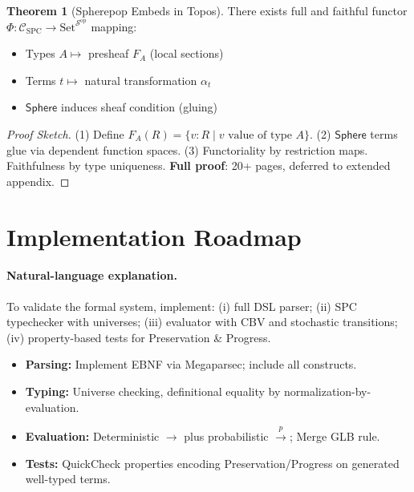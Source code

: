 \documentclass[12pt]{article}
\newcommand{\Sphere}{\mathsf{Sphere}}
\newcommand{\step}{\rightarrow}
\newcommand{\pstep}[1]{\xrightarrow{#1}}
\theoremstyle{definition}
\newtheorem{theorem}{Theorem}
\begin{document}
\begin{theorem}[Spherepop Embeds in Topos]
There exists full and faithful functor $\Phi : \mathcal{C}_{\text{SPC}} \to \text{Set}^{\mathcal{S}^{\text{op}}}$
mapping:
\begin{itemize}
\item Types $A \mapsto$ presheaf $F_A$ (local sections)
\item Terms $t \mapsto$ natural transformation $\alpha_t$
\item $\Sphere$ induces sheaf condition (gluing)
\end{itemize}
\end{theorem}
\begin{proof}[Proof Sketch]
(1) Define $F_A(R) = \{v : R \mid v \text{ value of type } A\}$.
(2) $\Sphere$ terms glue via dependent function spaces.
(3) Functoriality by restriction maps. Faithfulness by type uniqueness.
\textbf{Full proof}: 20+ pages, deferred to extended appendix.
\end{proof}

\section{Implementation Roadmap}
\paragraph{Natural-language explanation.}
To validate the formal system, implement: (i) full DSL parser; (ii) SPC typechecker with universes; (iii) evaluator with CBV and stochastic transitions; (iv) property-based tests for Preservation \& Progress.

\begin{itemize}[noitemsep]
  \item \textbf{Parsing:} Implement EBNF via Megaparsec; include all constructs.
  \item \textbf{Typing:} Universe checking, definitional equality by normalization-by-evaluation.
  \item \textbf{Evaluation:} Deterministic $\step$ plus probabilistic $\pstep{p}$; Merge GLB rule.
  \item \textbf{Tests:} QuickCheck properties encoding Preservation/Progress on generated well-typed terms.
\end{itemize}
\end{document}
